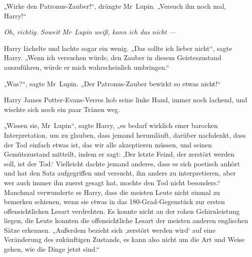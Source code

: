 „Wirke den Patronus-Zauber!“, drängte Mr~Lupin.
„Versuch ihn noch mal, Harry!“

\emph{Oh, richtig. Soweit Mr~Lupin weiß, kann ich das nicht —}

Harry lächelte und lachte sogar ein wenig.
„Das sollte ich lieber nicht“, sagte Harry.
„Wenn ich versuchen würde, den Zauber in diesem Geisteszustand auszuführen, würde er mich wahrscheinlich umbringen.“

„Was?“, sagte Mr~Lupin.
„Der Patronus-Zauber bewirkt so etwas nicht!“

Harry James Potter-Evans-Verres hob seine linke Hand, immer noch lachend, und wischte sich noch ein paar Tränen weg.

„Wissen sie, Mr~Lupin“, sagte Harry, „es bedarf wirklich einer barocken Interpretation, um zu glauben, dass jemand herumläuft, darüber nachdenkt, dass der Tod einfach etwas ist, das wir alle akzeptieren müssen, und seinen Gemütszustand mitteilt, indem er sagt: ‚Der letzte Feind, der zerstört werden soll, ist der Tod.‘ Vielleicht dachte jemand anderes, dass es sich poetisch anhört und hat den Satz aufgegriffen und versucht, ihn anders zu interpretieren, aber wer auch immer ihn zuerst gesagt hat, mochte den Tod nicht besonders.“ Manchmal verwunderte es Harry, dass die meisten Leute nicht einmal zu bemerken schienen, wenn sie etwas in das 180-Grad-Gegenstück zur ersten offensichtlichen Lesart verdrehten. Es konnte nicht an der rohen Gehirnleistung liegen, die Leute konnten die offensichtliche Lesart der meisten anderen englischen Sätze erkennen.
„Außerdem bezieht sich ‚zerstört werden wird‘ auf eine Veränderung des zukünftigen Zustands, es kann also nicht um die Art und Weise gehen, wie die Dinge jetzt sind.“


